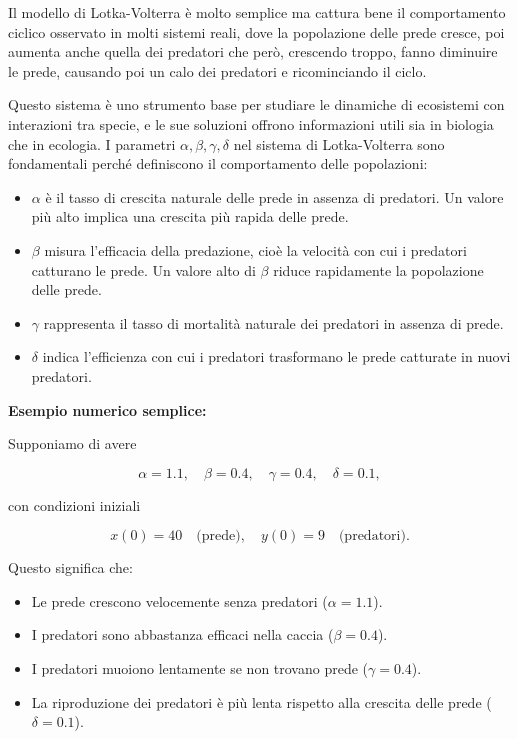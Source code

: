 \documentclass[12pt,a4paper]{article}
\begin{document}
Il modello di Lotka-Volterra è molto semplice ma cattura bene il comportamento ciclico osservato in molti sistemi reali, dove la popolazione delle prede cresce, poi aumenta anche quella dei predatori che però, crescendo troppo, fanno diminuire le prede, causando poi un calo dei predatori e ricominciando il ciclo.

Questo sistema è uno strumento base per studiare le dinamiche di ecosistemi con interazioni tra specie, e le sue soluzioni offrono informazioni utili sia in biologia che in ecologia.
\newpage
I parametri \(\alpha, \beta, \gamma, \delta\) nel sistema di Lotka-Volterra sono fondamentali perché definiscono il comportamento delle popolazioni:

\begin{itemize}
    \item \(\alpha\) è il tasso di crescita naturale delle prede in assenza di predatori. Un valore più alto implica una crescita più rapida delle prede.
    \item \(\beta\) misura l’efficacia della predazione, cioè la velocità con cui i predatori catturano le prede. Un valore alto di \(\beta\) riduce rapidamente la popolazione delle prede.
    \item \(\gamma\) rappresenta il tasso di mortalità naturale dei predatori in assenza di prede.
    \item \(\delta\) indica l’efficienza con cui i predatori trasformano le prede catturate in nuovi predatori.
\end{itemize}

\vspace{1em}

\textbf{Esempio numerico semplice:}

Supponiamo di avere

\[
\alpha = 1.1, \quad \beta = 0.4, \quad \gamma = 0.4, \quad \delta = 0.1,
\]

con condizioni iniziali

\[
x(0) = 40 \quad \text{(prede)}, \quad y(0) = 9 \quad \text{(predatori)}.
\]

Questo significa che:

\begin{itemize}
    \item Le prede crescono velocemente senza predatori (\(\alpha=1.1\)).
    \item I predatori sono abbastanza efficaci nella caccia (\(\beta=0.4\)).
    \item I predatori muoiono lentamente se non trovano prede (\(\gamma=0.4\)).
    \item La riproduzione dei predatori è più lenta rispetto alla crescita delle prede (\(\delta=0.1\)).
\end{itemize}
\end{document}
